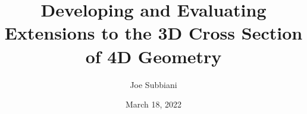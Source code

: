 \documentclass{l4proj}
\begin{document}
\title{Developing and Evaluating Extensions to the 3D Cross Section of 4D Geometry}
\author{Joe Subbiani}
\date{March 18, 2022}

\maketitle

\begin{abstract}


\end{abstract}
\end{document}
